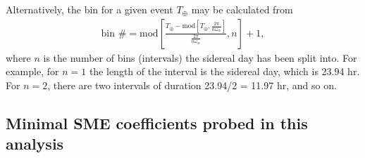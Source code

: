 %
Alternatively, the bin for a given event $T_\oplus$ may be calculated from
\begin{align}
\text{bin \#} =  
\text{mod}\left[\frac{T_\oplus - \text{mod}[T_\oplus,\frac{2\pi}{n\omega_\oplus}]}
{\frac{2\pi}{n\omega_\oplus}},n\right] + 1, 
\label{eq:sid_phase_bin}
\end{align}
where $n$ is the number of bins (intervals) the sidereal day has been split into. For example, 
for $n=1$ the length of the interval is the sidereal day, which
is 23.94 hr. For $n=2$, there are two intervals of duration 23.94/2 = 11.97 hr, 
and so on. 



\subsection{Minimal SME coefficients probed in this analysis}
\label{subsec:WC}

